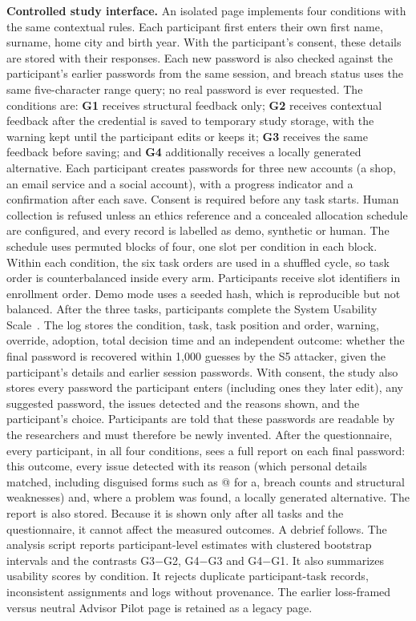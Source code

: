 \documentclass[conference]{IEEEtran}
\begin{document}
\textbf{Controlled study interface.} An isolated page implements four conditions with the same contextual rules. Each participant first enters their own first name, surname, home city and birth year. With the participant's consent, these details are stored with their responses. Each new password is also checked against the participant's earlier passwords from the same session, and breach status uses the same five-character range query; no real password is ever requested. The conditions are: \textbf{G1} receives structural feedback only; \textbf{G2} receives contextual feedback after the credential is saved to temporary study storage, with the warning kept until the participant edits or keeps it; \textbf{G3} receives the same feedback before saving; and \textbf{G4} additionally receives a locally generated alternative. Each participant creates passwords for three new accounts (a shop, an email service and a social account), with a progress indicator and a confirmation after each save. Consent is required before any task starts. Human collection is refused unless an ethics reference and a concealed allocation schedule are configured, and every record is labelled as demo, synthetic or human. The schedule uses permuted blocks of four, one slot per condition in each block. Within each condition, the six task orders are used in a shuffled cycle, so task order is counterbalanced inside every arm. Participants receive slot identifiers in enrollment order. Demo mode uses a seeded hash, which is reproducible but not balanced. After the three tasks, participants complete the System Usability Scale~\cite{brooke}. The log stores the condition, task, task position and order, warning, override, adoption, total decision time and an independent outcome: whether the final password is recovered within 1,000 guesses by the S5 attacker, given the participant's details and earlier session passwords. With consent, the study also stores every password the participant enters (including ones they later edit), any suggested password, the issues detected and the reasons shown, and the participant's choice. Participants are told that these passwords are readable by the researchers and must therefore be newly invented. After the questionnaire, every participant, in all four conditions, sees a full report on each final password: this outcome, every issue detected with its reason (which personal details matched, including disguised forms such as @ for a, breach counts and structural weaknesses) and, where a problem was found, a locally generated alternative. The report is also stored. Because it is shown only after all tasks and the questionnaire, it cannot affect the measured outcomes. A debrief follows. The analysis script reports participant-level estimates with clustered bootstrap intervals and the contrasts G3$-$G2, G4$-$G3 and G4$-$G1. It also summarizes usability scores by condition. It rejects duplicate participant-task records, inconsistent assignments and logs without provenance. The earlier loss-framed versus neutral Advisor Pilot page is retained as a legacy page.
\end{document}

